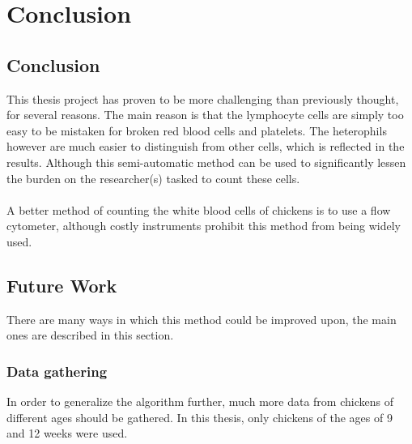 \chapter{Conclusion}\label{cha:conclusions}

\section{Conclusion}\label{sec:research:history}
This thesis project has proven to be more challenging than previously thought, for several reasons. The main reason is that the lymphocyte cells are simply too easy to be mistaken for broken red blood cells and platelets. The heterophils however are much easier to distinguish from other cells, which is reflected in the results. Although this semi-automatic method can be used to significantly lessen the burden on the researcher(s) tasked to count these cells.\\\\
A better method of counting the white blood cells of chickens is to use a flow cytometer\cite{Seliger201286}, although costly instruments prohibit this method from being widely used.

\section{Future Work}\label{sec:research:history}
There are many ways in which this method could be improved upon, the main ones are described in this section.

\subsection{Data gathering}\label{sec:research:history}
In order to generalize the algorithm further, much more data from chickens of different ages should be gathered. In this thesis, only chickens of the ages of 9 and 12 weeks were used. 